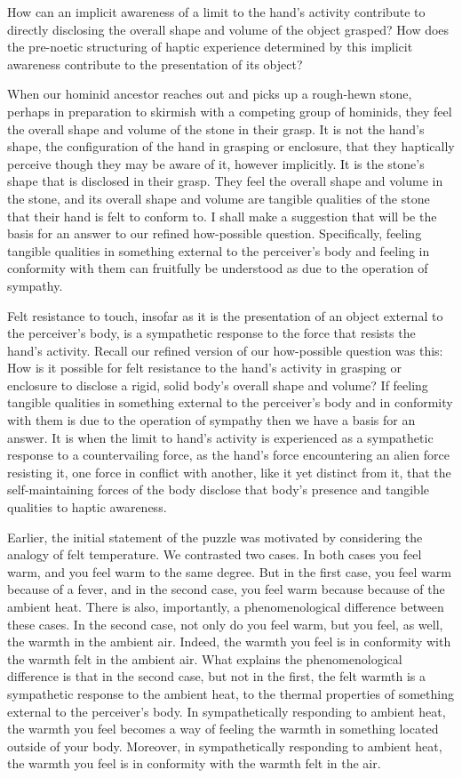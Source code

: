 How can an implicit awareness of a limit to the hand's activity contribute to directly disclosing the overall shape and volume of the object grasped? How does the pre-noetic structuring of haptic experience determined by this implicit awareness contribute to the presentation of its object? 

When our hominid ancestor reaches out and picks up a rough-hewn stone, perhaps in preparation to skirmish with a competing group of hominids, they feel the overall shape and volume of the stone in their grasp. It is not the hand's shape, the configuration of the hand in grasping or enclosure, that they haptically perceive though they may be aware of it, however implicitly. It is the stone's shape that is disclosed in their grasp. They feel the overall shape and volume in the stone, and its overall shape and volume are tangible qualities of the stone that their hand is felt to conform to. I shall make a suggestion that will be the basis for an answer to our refined how-possible question. Specifically, feeling tangible qualities in something external to the perceiver's body and feeling in conformity with them can fruitfully be understood as due to the operation of sympathy. 

Felt resistance to touch, insofar as it is the presentation of an object external to the perceiver's body, is a sympathetic response to the force that resists the hand's activity. Recall our refined version of our how-possible question was this: How is it possible for felt resistance to the hand's activity in grasping or enclosure to disclose a rigid, solid body's overall shape and volume? If feeling tangible qualities in something external to the perceiver's body and in conformity with them is due to the operation of sympathy then we have a basis for an answer. It is when the limit to hand's activity is experienced as a sympathetic response to a countervailing force, as the hand's force encountering an alien force resisting it, one force in conflict with another, like it yet distinct from it, that the self-maintaining forces of the body disclose that body's presence and tangible qualities to haptic awareness.

Earlier, the initial statement of the puzzle was motivated by considering the analogy of felt temperature. We contrasted two cases. In both cases you feel warm, and you feel warm to the same degree. But in the first case, you feel warm because of a fever, and in the second case, you feel warm because because of the ambient heat. There is also, importantly, a phenomenological difference between these cases. In the second case, not only do you feel warm, but you feel, as well, the warmth in the ambient air. Indeed, the warmth you feel is in conformity with the warmth felt in the ambient air. What explains the phenomenological difference is that in the second case, but not in the first, the felt warmth is a sympathetic response to the ambient heat, to the thermal properties of something external to the perceiver's body. In sympathetically responding to ambient heat, the warmth you feel becomes a way of feeling the warmth in something located outside of your body. Moreover, in sympathetically responding to ambient heat, the warmth you feel is in conformity with the warmth felt in the air.

